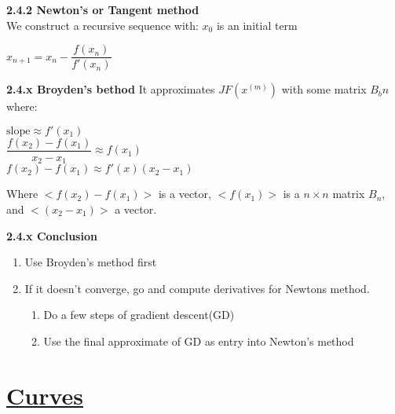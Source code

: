 \documentclass{article}
\begin{document}
\begin{multicols}{2}
\textbf{2.4.2 Newton's or Tangent method}\\
We construct a recursive sequence with: $x_0$ is an initial term
\begin{center}
    \begin{math}
        x_{n+1} = x_n - \dfrac{f(x_n)}{f'(x_n)}
    \end{math}
\end{center}

\textbf{2.4.x Broyden's bethod}
It approximates $JF(x^{(m)})$ with some matrix $B_bn$
where:
\begin{center}
    \begin{math}
        \text{slope} \approx f'(x_1)
    \end{math}\\
    \begin{math}
        \dfrac{f(x_2) - f(x_1)} {x_2 - x_1} \approx f(x_1)
    \end{math}\\
    \begin{math}
        f(x_2) - f(x_1) \approx f'(x) (x_2 - x_1)
    \end{math}
\end{center}
Where $<f(x_2) - f(x_1)>$ is a vector, $<f(x_1)>$ is a $n \times n$ matrix $B_n$, and
$<(x_2 - x_1)>$ a vector.

\textbf{2.4.x Conclusion}
\begin{enumerate}
    \item Use Broyden's method first
    \item If it doesn't converge, go and compute derivatives for
        Newtons method.
    \begin{enumerate}
        \item Do a few steps of gradient descent(GD)
        \item Use the final approximate of GD as entry into Newton's method
    \end{enumerate}
\end{enumerate}

\section{\underline{Curves}}

\end{multicols}
\end{document}
